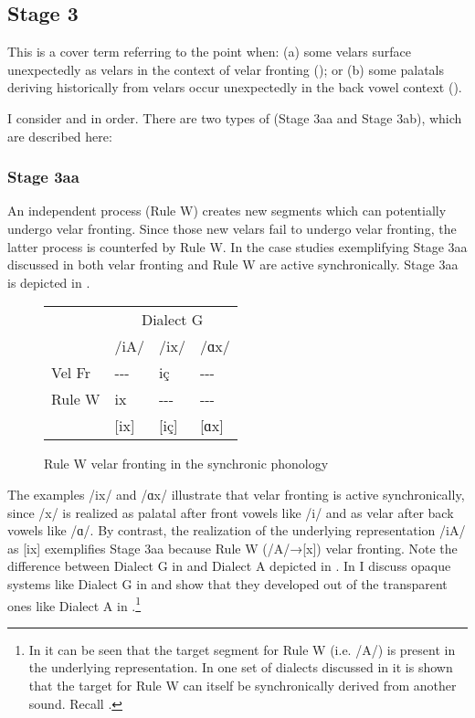 \begin{xlist}
\begin{xlist}
\subsection{Stage 3}
This is a cover term referring to the point when: (a) some velars surface unexpectedly as velars in the context of velar fronting (); or (b) some palatals deriving historically from velars occur unexpectedly in the back vowel context ().

I consider  and  in order. There are two types of  (Stage 3aa and Stage 3ab), which are described here:

\subsubsection{Stage 3aa}
An independent process (Rule W) creates new segments which can potentially undergo velar fronting. Since those new velars fail to undergo velar fronting, the latter process is counterfed by Rule W. In the case studies exemplifying Stage 3aa discussed in  both velar fronting and Rule W are active synchronically. Stage 3aa is depicted in .

\begin{figure}
\begin{tabular}{*4{l}}
             & \multicolumn{3}{c}{Dialect G}\\\cmidrule(lr){2-4}
             &   /iA/      & /ix/      & /ɑx/     \\
    Vel Fr   &   {}-{}-{}- & iç        & {}-{}-{}-\\
    Rule W   &    ix       & {}-{}-{}- & {}-{}-{}-\\
             &   [ix]      & [iç]      & [ɑx]     \\
\end{tabular}
\caption{Rule W  velar fronting in the synchronic phonology\label{fig:2.9}}
\end{figure}

The examples /ix/ and /ɑx/ illustrate that velar fronting is active synchronically, since /x/ is realized as palatal after front vowels like /i/ and as velar after back vowels like /ɑ/. By contrast, the realization of the underlying representation /iA/ as [ix] exemplifies  Stage 3aa because Rule W (/A/→[x])  velar fronting. Note the difference between Dialect G in  and Dialect A depicted in . In  I discuss opaque systems like Dialect G in  and show that they developed out of the transparent ones like Dialect A in .\footnote{In  it can be seen that the target segment for Rule W (i.e. /A/) is present in the underlying representation. In one set of dialects discussed in  it is shown that the target for Rule W can itself be synchronically derived from another sound. Recall .}


\end{xlist}
\end{xlist}
